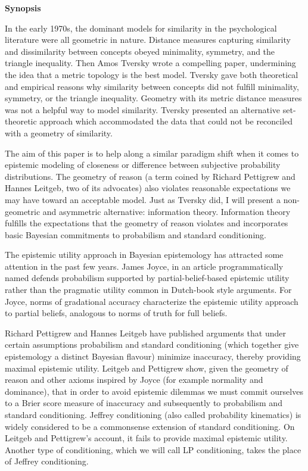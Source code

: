 \documentclass[11pt]{article} \usepackage{october} \onehalfspacing
\begin{document}
\textbf{Synopsis}

In the early 1970s, the dominant models for similarity in the
psychological literature were all geometric in nature. Distance
measures capturing similarity and dissimilarity between concepts
obeyed minimality, symmetry, and the triangle inequality. Then Amos
Tversky wrote a compelling paper, 
undermining the idea that a metric topology is the best model. Tversky
gave both theoretical and empirical reasons why similarity between
concepts did not fulfill minimality, symmetry, or the triangle
inequality. Geometry with its metric distance measures was not a
helpful way to model similarity. Tversky presented an alternative
set-theoretic approach which accommodated the data that could not be
reconciled with a geometry of similarity.

The aim of this paper is to help along a similar paradigm shift when
it comes to epistemic modeling of closeness or difference between
subjective probability distributions. The geometry of reason (a term
coined by Richard Pettigrew and Hannes Leitgeb, two of its advocates)
also violates reasonable expectations we may have toward an acceptable
model. Just as Tversky did, I will present a non-geometric and
asymmetric alternative: information theory. Information theory
fulfills the expectations that the geometry of reason violates and
incorporates basic Bayesian commitments to probabilism and standard
conditioning.

The epistemic utility approach in Bayesian epistemology has attracted
some attention in the past few years. James Joyce, in an article
programmatically named  defends probabilism supported by partial-belief-based
epistemic utility rather than the pragmatic utility common in
Dutch-book style arguments. For Joyce, norms of gradational accuracy
characterize the epistemic utility approach to partial beliefs,
analogous to norms of truth for full beliefs.

Richard Pettigrew and Hannes Leitgeb have published arguments that
under certain assumptions probabilism and standard conditioning (which
together give epistemology a distinct Bayesian flavour) minimize
inaccuracy, thereby providing maximal epistemic utility. Leitgeb and
Pettigrew show, given the geometry of reason and other axioms inspired
by Joyce (for example normality and dominance), that in order to avoid
epistemic dilemmas we must commit ourselves to a Brier score measure
of inaccuracy and subsequently to probabilism and standard
conditioning. Jeffrey conditioning (also called probability
kinematics) is widely considered to be a commonsense extension of
standard conditioning. On Leitgeb and Pettigrew's account, it fails to
provide maximal epistemic utility. Another type of conditioning, which
we will call LP conditioning, takes the place of Jeffrey conditioning.
\end{document}
